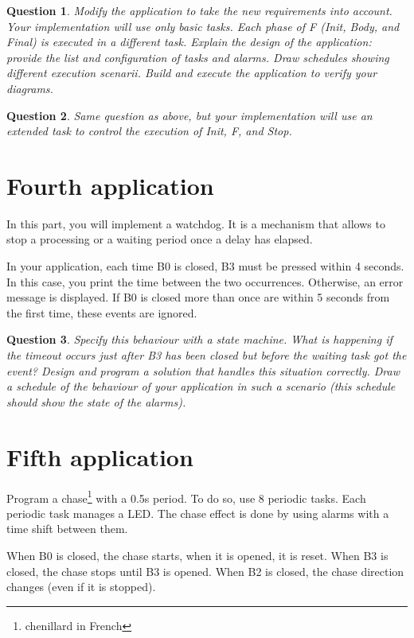\documentclass[11pt]{report}
\newtheorem{ex}{Question}
\begin{document}
\begin{ex}
    Modify the application to take the new requirements into account.
    Your implementation will use only basic tasks.
    Each phase of F (Init, Body, and Final) is executed in a different task.
    Explain the design of the application: provide the list and configuration of tasks and alarms.
    Draw schedules showing different execution scenarii.
    Build and execute the application to verify your diagrams.
\end{ex}

\begin{ex}
    Same question as above, but your implementation will use an extended task to control the execution of Init, F, and Stop.
\end{ex}

\section{Fourth application}

In this part, you will implement a watchdog. It is a mechanism that allows to stop a processing or a waiting period once a delay has elapsed.

In your application, each time B0 is closed, B3 must be pressed within 4 seconds. In this case, you print the time between the two occurrences. Otherwise, an error message is displayed. If B0 is closed more than once are within 5 seconds from the first time, these events are ignored.

\begin{ex}
    Specify this behaviour with a state machine.
    What is happening if the timeout occurs just after B3 has been closed but before the waiting task got the event?
    Design and program a solution that handles this situation correctly.
    Draw a schedule of the behaviour of your application in such a scenario (this schedule should show the state of the alarms).
\end{ex}

\section{Fifth application}

Program a chase\footnote{chenillard in French} with a 0.5s period. To do so, use 8 periodic tasks. Each periodic task manages a LED. The chase effect is done by using alarms with a time shift between them.

When B0 is closed, the chase starts, when it is opened, it is reset.
When B3 is closed, the chase stops until B3 is opened.
When B2 is closed, the chase direction changes (even if it is stopped).
\end{document}
